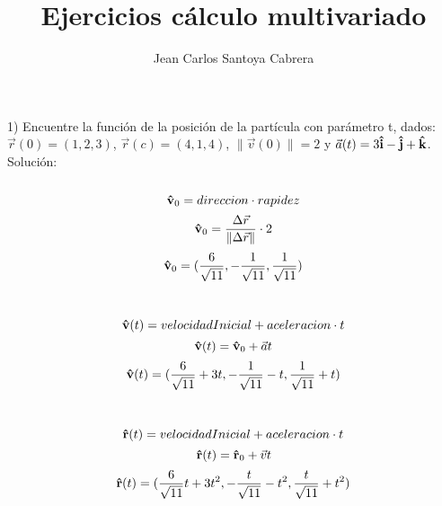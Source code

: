 \documentclass{article}
\author{Jean Carlos Santoya Cabrera}
\DeclareRobustCommand{\uvec}[1]{{%
  \ifcsname uvec#1\endcsname
     \csname uvec#1\endcsname
   \else
    \bm{\hat{\mathbf{#1}}}%
   \fi
}}
\newcommand{\tab}[1][1cm]{\hspace*{#1}}
\begin{document}
    \title{Ejercicios cálculo multivariado}
    \maketitle
    \begin{flushleft}
        1) Encuentre la función de la posición de la partícula con parámetro t, dados: $\vec{r}(0) = (1, 2, 3)$, $\vec{r}(c) = (4, 1, 4)$,
         $\|\vec{v}(0)\| = 2$ y $\vec{a}(t) = 3\uvec{i} -\uvec{j} + \uvec{k}$.\\
        \tab[3.2mm] Solución:\\
        \\
        \begin{equation}
            \uvec{v}_0 = direccion \cdot rapidez
        \end{equation}
        \begin{equation}
            \uvec{v}_0 = \frac{ \Delta \vec{r} }{ \|\Delta \vec{r}\| } \cdot 2
        \end{equation}
        \begin{equation}
            \uvec{v}_0 = (\frac{6}{\sqrt{11}}, -\frac{1}{\sqrt{11}}, \frac{1}{\sqrt{11}})
        \end{equation}

        \\
        \begin{equation}
            \uvec{v}(t) = velocidadInicial + aceleracion \cdot t
        \end{equation}
        \begin{equation}
            \uvec{v}(t) = \uvec{v}_0 + \vec{a} t
        \end{equation}
        \begin{equation}
            \uvec{v}(t) = (\frac{6}{\sqrt{11}} + 3t, -\frac{1}{\sqrt{11}} - t, \frac{1}{\sqrt{11}} + t)
        \end{equation}

        \\
        \begin{equation}
            \uvec{r}(t) = velocidadInicial + aceleracion \cdot t
        \end{equation}
        \begin{equation}
            \uvec{r}(t) = \uvec{r}_0 + \vec{v} t
        \end{equation}
        \begin{equation}
            \uvec{r}(t) = (\frac{6}{\sqrt{11}}t + 3t^2, -\frac{t}{\sqrt{11}} - t^2, \frac{t}{\sqrt{11}} + t^2)
        \end{equation}
    \end{flushleft}
    
\end{document}
